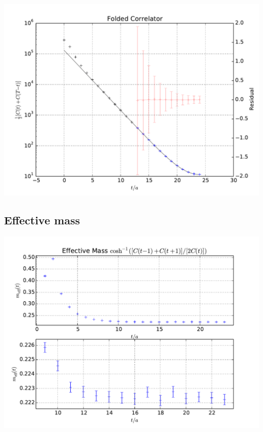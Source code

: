 \documentclass[english, fleqn]{beamer}
\begin{document}
\begin{frame}
    \begin{center}
        \includegraphics[height=\textheight]{plots/A100_24_L24_T48_beta190_mul0100_musig150_mudel190_kappa1632550__ev120__TB2_SO_LI6_new_c4_folded.pdf}
    \end{center}
\end{frame}

\subsection*{Effective mass}

\begin{frame}
    \begin{center}
        \includegraphics[height=\textheight]{plots/A100_24_L24_T48_beta190_mul0100_musig150_mudel190_kappa1632550__ev120__TB2_SO_LI6_new_c2_m_eff.pdf}
    \end{center}
\end{frame}
\end{document}
